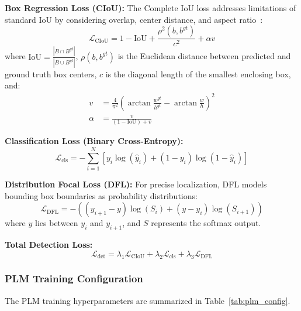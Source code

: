 \documentclass[conference]{IEEEtran}
\begin{document}
\textbf{Box Regression Loss (CIoU):} The Complete IoU loss addresses limitations of standard IoU by considering overlap, center distance, and aspect ratio~\cite{zheng2020}:
\begin{equation}
    \mathcal{L}_{\text{CIoU}} = 1 - \text{IoU} + \frac{\rho^2(b, b^{gt})}{c^2} + \alpha v
\end{equation}
where $\text{IoU} = \frac{|B \cap B^{gt}|}{|B \cup B^{gt}|}$, $\rho(b, b^{gt})$ is the Euclidean distance between predicted and ground truth box centers, $c$ is the diagonal length of the smallest enclosing box, and:
\begin{align}
    v &= \frac{4}{\pi^2}\left(\arctan\frac{w^{gt}}{h^{gt}} - \arctan\frac{w}{h}\right)^2 \\
    \alpha &= \frac{v}{(1 - \text{IoU}) + v}
\end{align}

\textbf{Classification Loss (Binary Cross-Entropy):}
\begin{equation}
    \mathcal{L}_{\text{cls}} = -\sum_{i=1}^{N}\left[y_i \log(\hat{y}_i) + (1-y_i)\log(1-\hat{y}_i)\right]
\end{equation}

\textbf{Distribution Focal Loss (DFL):} For precise localization, DFL models bounding box boundaries as probability distributions:
\begin{equation}
    \mathcal{L}_{\text{DFL}} = -\left((y_{i+1} - y)\log(S_i) + (y - y_i)\log(S_{i+1})\right)
\end{equation}
where $y$ lies between $y_i$ and $y_{i+1}$, and $S$ represents the softmax output.

\textbf{Total Detection Loss:}
\begin{equation}
    \mathcal{L}_{\text{det}} = \lambda_1 \mathcal{L}_{\text{CIoU}} + \lambda_2 \mathcal{L}_{\text{cls}} + \lambda_3 \mathcal{L}_{\text{DFL}}
\end{equation}

\subsubsection{PLM Training Configuration}
The PLM training hyperparameters are summarized in Table~\ref{tab:plm_config}.
\end{document}
